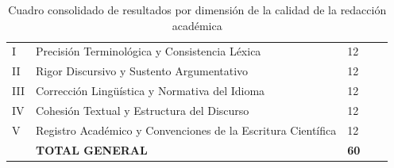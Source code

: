 \begin{table}[htbp]
\centering
\scriptsize
\caption{Cuadro consolidado de resultados por dimensión de la calidad de la redacción académica}\label{tab:consolidado-redaccion-academica}
\begin{tabularx}{\textwidth}{|C{0.8cm}|L{7.5cm}|C{1.8cm}|C{1.8cm}|X|}
\hline
{}
 &  &  &  &  \\ \hline
I & Precisión Terminológica y Consistencia Léxica & 12 & & \\ \hline
{}
II & Rigor Discursivo y Sustento Argumentativo & 12 & & \\ \hline
III & Corrección Lingüística y Normativa del Idioma & 12 & & \\ \hline
{}
IV & Cohesión Textual y Estructura del Discurso & 12 & & \\ \hline
V & Registro Académico y Convenciones de la Escritura Científica & 12 & & \\ \hline
{}
& \textbf{TOTAL GENERAL} & \textbf{60} & & \\ \hline
\end{tabularx}
\normalsize
\end{table}

